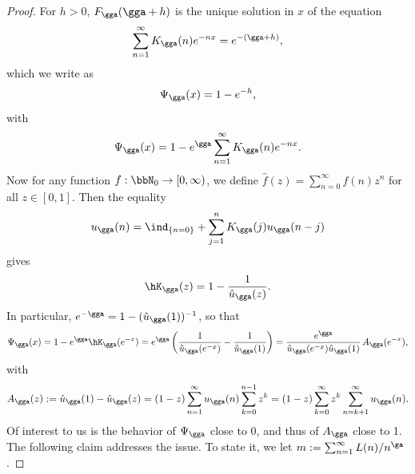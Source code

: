 \begin{proof}
For $h > 0$, $F_\gga(\gga + h)$ is the unique solution in $x$ of the equation
\begin{equation}
\sum_{n=1}^\infty K_\gga(n) e^{- n x} = e^{- (\gga + h)},
\end{equation}
which we write as
\begin{equation}\label{FreeEnergyEquation}
\Psi_\gga(x) = 1 - e^{- h},
\end{equation}
with
\begin{equation}
\Psi_\gga(x) = 1 - e^\gga \sum_{n=1}^\infty K_\gga(n) e^{- n x}.
\end{equation}
Now for any function $f : \bbN_0 \to [0,\infty)$, we define $\hat f(z) = \sum_{n=0}^\infty f(n) z^n$ for all $z \in [0,1]$. Then the equality
\begin{equation}
u_\gga(n) = \ind_{\{n = 0\}} + \sum_{j=1}^n K_\gga(j) u_\gga(n-j)
\end{equation}
gives
\begin{equation}
\hK_\gga(z) = 1 - \frac{1}{\hat u_\gga(z)}.
\end{equation}
In particular, $e^{- \gga} = 1 - (\hat u_\gga(1))^{-1}$, so that
\begin{equation}\label{PsiAndA}
\Psi_\gga(x) = 1 - e^\gga \hK_\gga(e^{- x}) = e^\gga \left(\frac{1}{\hat u_\gga(e^{- x})} - \frac{1}{\hat u_\gga(1)} \right) = \frac{e^\gga}{\hat u_\gga(e^{- x}) \hat u_\gga(1)} \, A_\gga(e^{- x}),
\end{equation}
with
\begin{equation}
A_\gga(z) := \hat u_\gga(1) - \hat u_\gga(z) = (1 - z) \sum_{n=1}^\infty u_\gga(n) \sum_{k=0}^{n-1} z^k = (1 - z) \sum_{k=0}^\infty z^k \sum_{n=k+1}^\infty u_\gga(n).
\end{equation}
Of interest to us is the behavior of $\Psi_\gga$ close to 0, and thus of $A_\gga$ close to 1. The following claim addresses the issue. To state it, we let $m := \sum_{n=1}^\infty L(n)/n^\ga$.


\end{proof}
